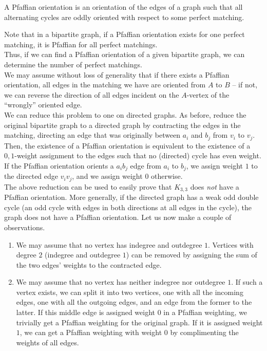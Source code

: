 \begin{fdef}
	A Pfaffian orientation is an orientation of the edges of a graph such that all alternating cycles are oddly oriented with respect to some perfect matching. 
\end{fdef}
Note that in a bipartite graph, if a Pfaffian orientation exists for one perfect matching, it is Pfaffian for all perfect matchings.\\

Thus, if we can find a Pfaffian orientation of a given bipartite graph, we can determine the number of perfect matchings.\\
We may assume without loss of generality that if there exists a Pfaffian orientation, all edges in the matching we have are oriented from $A$ to $B$ -- if not, we can reverse the direction of all edges incident on the $A$-vertex of the ``wrongly'' oriented edge.\\
We can reduce this problem to one on directed graphs. As before, reduce the original bipartite graph to a directed graph by contracting the edges in the matching, directing an edge that was originally between $a_i$ and $b_j$ from $v_i$ to $v_j$. Then, the existence of a Pfaffian orientation is equivalent to the existence of a $0,1$-weight assignment to the edges such that no (directed) cycle has even weight. If the Pfaffian orientation orients a $a_ib_j$ edge from $a_i$ to $b_j$, we assign weight $1$ to the directed edge $v_iv_j$, and we assign weight $0$ otherwise.\\
The above reduction can be used to easily prove that $K_{3,3}$ does \emph{not} have a Pfaffian orientation. More generally, if the directed graph has a weak odd double cycle (an odd cycle with edges in both directions at all edges in the cycle), the graph does not have a Pfaffian orientation. Let us now make a couple of observations.
\begin{enumerate}
	\item We may assume that no vertex has indegree and outdegree $1$. Vertices with degree $2$ (indegree and outdegree $1$) can be removed by assigning the sum of the two edges' weights to the contracted edge.
	\item We may assume that no vertex has neither indegree nor outdegree $1$. If such a vertex exists, we can split it into two vertices, one with all the incoming edges, one with all the outgoing edges, and an edge from the former to the latter. If this middle edge is assigned weight $0$ in a Pfaffian weighting, we trivially get a Pfaffian weighting for the original graph. If it is assigned weight $1$, we can get a Pfaffian weighting with weight $0$ by complimenting the weights of all edges.
\end{enumerate}

